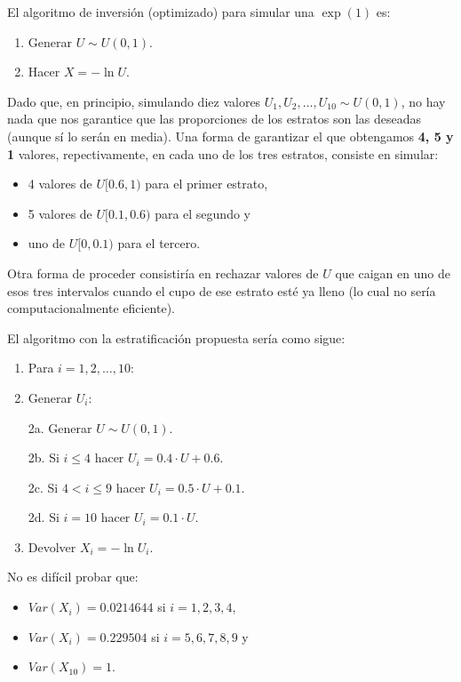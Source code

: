 \documentclass[
]{book}
\theoremstyle{break}
\theoremstyle{definition}
\theoremstyle{definition}
\theoremstyle{definition}
\theoremstyle{remark}
\begin{document}
El algoritmo de inversión (optimizado) para simular una
\(\exp\left(1\right)\) es:

\begin{enumerate}
\def\labelenumi{\arabic{enumi}.}
\item
  Generar \(U\sim U\left( 0,1\right)\).
\item
  Hacer \(X=-\ln U\).
\end{enumerate}

Dado que, en
principio, simulando diez valores
\(U_{1},U_{2},\ldots,U_{10}\sim U\left( 0,1\right)\), no hay nada que
nos garantice que las proporciones de los estratos son las deseadas
(aunque sí lo serán en media). Una forma de garantizar el que obtengamos \textbf{4, 5 y 1} valores,
repectivamente, en cada uno de los tres estratos,
consiste en simular:

\begin{itemize}
\item
  4 valores de
  \(U[0.6,1)\) para el primer estrato,
\item
  5 valores
  de \(U[0.1,0.6)\) para el
  segundo y
\item
  uno de \(U[0,0.1)\)
  para el tercero.
\end{itemize}

Otra forma de proceder consistiría en rechazar valores de \(U\)
que caigan en uno de esos tres intervalos cuando el cupo de ese estrato
esté ya lleno (lo cual no sería computacionalmente eficiente).

El algoritmo con la estratificación propuesta sería como sigue:

\begin{enumerate}
\def\labelenumi{\arabic{enumi}.}
\item
  Para \(i=1,2,\ldots, 10\):
\item
  Generar \(U_{i}\):

  2a. Generar \(U\sim U\left( 0,1\right)\).

  2b. Si \(i\leq4\) hacer \(U_{i} = 0.4 \cdot U + 0.6\).

  2c. Si \(4<i\leq9\) hacer \(U_{i} = 0.5 \cdot U + 0.1\).

  2d. Si \(i=10\) hacer \(U_{i} = 0.1 \cdot U\).
\item
  Devolver \(X_{i}=-\ln U_{i}\).
\end{enumerate}

No es difícil probar que:

\begin{itemize}
\item
  \(Var\left( X_{i}\right) = 0.0214644\) si \(i=1,2,3,4\),
\item
  \(Var\left( X_{i}\right) = 0.229504\) si \(i=5,6,7,8,9\) y
\item
  \(Var\left( X_{10}\right) = 1\).
\end{itemize}
\end{document}
